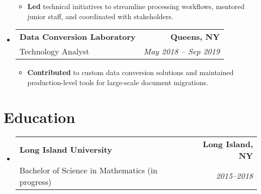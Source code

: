 \documentclass[a4paper]{article}
\makeatletter
\newcommand{\TwoRowSubheading}[4]{
  \item \begin{tabular*}{.95\textwidth}{@{}l @{\extracolsep{\fill}} r@{}}
    \textbf{#1} & \textbf{#2} \\
    {\color{gray}#3} & {\itshape #4} \\
  \end{tabular*}
}
\makeatother
\begin{document}
\begin{itemize}[leftmargin=*,label=]
\begin{itemize}[leftmargin=1em,rightmargin=1em,label=]
    \item \textbf{Led} technical initiatives to streamline processing workflows, mentored junior staff, and coordinated with stakeholders.
\end{itemize}

\TwoRowSubheading
{Data Conversion Laboratory}
{Queens, NY}
{Technology Analyst}
{May 2018 -- Sep 2019}

\begin{itemize}[leftmargin=1em,rightmargin=1em,label=]
    \item \textbf{Contributed} to custom data conversion solutions and maintained production-level tools for large-scale document migrations.
\end{itemize}

\end{itemize}

\section{Education}
\begin{itemize}[leftmargin=*]    
\TwoRowSubheading
{Long Island University}
{Long Island, NY}
{Bachelor of Science in Mathematics (in progress)}
{2015--2018}
\end{itemize}
\end{document}
